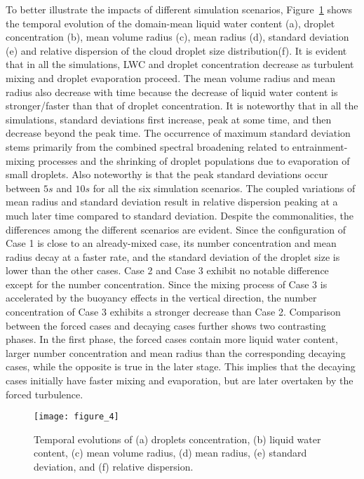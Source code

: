 \documentclass[draft,linenumbers]{agujournal}
\newcommand{\Fig}[1]{Figure~\ref{#1}}
\begin{document}
To better illustrate the impacts of different simulation scenarios, \Fig{fig:temporal_variation} shows the temporal evolution of the domain-mean liquid water content (a), droplet concentration (b), 
mean volume radius (c), mean radius (d), standard deviation (e) and relative dispersion of the cloud droplet size distribution(f). It is evident that in all the simulations, LWC and droplet concentration decrease as turbulent mixing and droplet evaporation proceed. The mean volume radius and mean radius also decrease with time because the decrease of liquid water content is stronger/faster than that of droplet concentration. It is noteworthy that in all the simulations, standard deviations first increase, peak at some time, and then decrease beyond the peak time. The occurrence of maximum standard deviation stems primarily from the combined spectral broadening related to entrainment-mixing processes and the shrinking of droplet populations due to evaporation of small droplets. Also noteworthy is that the peak standard deviations occur between $5s$ and $10s$ for all the six simulation scenarios. The coupled variations of mean radius and standard deviation result in relative dispersion peaking at a much later time compared to standard deviation. Despite the commonalities, the differences among the different scenarios are evident. Since the configuration of Case 1 is close to an already-mixed case, its number concentration and mean radius decay at a faster rate, and the standard deviation of the droplet size is lower than the other cases. Case 2 and Case 3 exhibit no notable difference except for the number concentration. Since the mixing process of Case 3 is accelerated by the buoyancy effects in the vertical direction, the number concentration of Case 3 exhibits a stronger decrease than Case 2. Comparison between the forced cases and decaying cases further shows two contrasting phases. In the first phase, the forced cases contain more liquid water content, larger number concentration and mean radius than the corresponding decaying cases, while the opposite is true in the later stage. This implies that the decaying cases initially have faster mixing and evaporation, but are later overtaken by the forced turbulence. 
  
\begin{figure}[!htbp]\centering
\texttt{[image: figure\_4]}
\caption{Temporal evolutions of (a) droplets concentration, (b) liquid water content, (c) mean volume radius, (d) mean radius, (e) standard deviation, and (f) relative dispersion.}\label{fig:temporal_variation} 
\end{figure}
\end{document}
